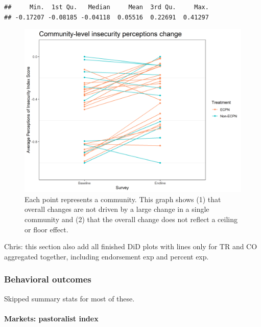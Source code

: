 \documentclass[
]{article}
\begin{document}
\begin{verbatim}
##     Min.  1st Qu.   Median     Mean  3rd Qu.     Max. 
## -0.17207 -0.08185 -0.04118  0.05516  0.22691  0.41297
\end{verbatim}

\begin{figure}%
\centering
\includegraphics[width=\linewidth]{../survey_dat/figs/did_plots/inComm_plot_disag.png}
\caption{Each point represents a community. This graph shows (1) that overall changes are not driven by a large change in a single community and (2) that the overall change does not reflect a ceiling or floor effect.}\label{fig:in_comm_dis}
\end{figure}

Chris: this section also add all finished DiD plots with lines only for
TR and CO aggregated together, including endorsement exp and percent
exp.

\hypertarget{behavioral-outcomes}{%
\subsubsection{Behavioral outcomes}\label{behavioral-outcomes}}

Skipped summary stats for most of these.

\hypertarget{markets-pastoralist-index}{%
\paragraph{Markets: pastoralist index}\label{markets-pastoralist-index}}
\end{document}

